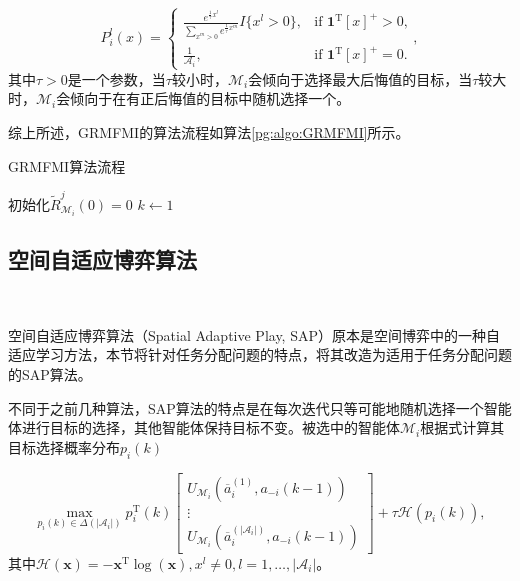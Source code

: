 \begin{equation}
	P_i^l(x) = 	
	\begin{cases}
		\frac{e^{\frac{1}{\tau} x^l}}{\sum_{x^m>0}e^{\frac{1}{\tau}x^m}} I\{x^l>0\}, & \text{if ${\bm 1}^{\mathrm T}[x]^+>0$,}\\
		\frac{1}{\mathcal{A}_i}, & \text{if ${\bm{1}}^{\mathrm T}[x]^+=0$.}
	\end{cases},
\end{equation}
其中$\tau>0$是一个参数，当$\tau$较小时，$\mathcal{M}_i$会倾向于选择最大后悔值的目标，当$\tau$较大时，$\mathcal{M}_i$会倾向于在有正后悔值的目标中随机选择一个。

综上所述，GRMFMI的算法流程如算法\ref{pg:algo:GRMFMI}所示。

\begin{algorithm}[htb]
	\caption{GRMFMI算法流程}
	\label{pg:algo:GRMFMI}
	\small
	\SetAlgoLined
	
	初始化$\widetilde R_{\mathcal{M}_i}^j(0)=0$\;
	$k \gets 1$\;
\end{algorithm}


\subsection{空间自适应博弈算法}
\

空间自适应博弈算法（Spatial Adaptive Play, SAP）原本是空间博弈中的一种自适应学习方法，本节将针对任务分配问题的特点，将其改造为适用于任务分配问题的SAP算法。

不同于之前几种算法，SAP算法的特点是在每次迭代只等可能地随机选择一个智能体进行目标的选择，其他智能体保持目标不变。被选中的智能体$\mathcal{M}_i$根据式计算其目标选择概率分布$p_i(k)$

\begin{equation}
\label{pg:eq:MaxEntropy}
	\max_{p_i(k) \in \Delta(|\mathcal{A}_i|)} p_i^{\mathrm T}(k) \begin{bmatrix}
		U_{\mathcal{M}_i}(\overline a_i^{(1)},a_{-i}(k-1))\\ \vdots \\ U_{\mathcal{M}_i}(\overline a_i^{(|\mathcal{A}_i|)},a_{-i}(k-1))
	\end{bmatrix}
	+ \tau \mathcal{H}(p_i(k)),
\end{equation}
其中$\mathcal{H}({\bm x}) = -{\bm x}^{\mathrm T} \log({\bm x}), x^l \neq 0,l=1,\dots,|\mathcal{A}_i|$。

